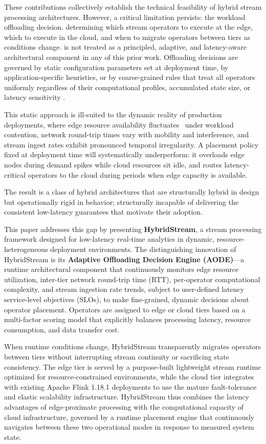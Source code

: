 \documentclass[preprint,review,12pt]{elsarticle}
\begin{document}
These contributions collectively establish the technical feasibility of hybrid stream processing architectures. However, a critical limitation persists: the workload offloading decision. determining which stream operators to execute at the edge, which to execute in the cloud, and when to migrate operators between tiers as conditions change. is not treated as a principled, adaptive, and latency-aware architectural component in any of this prior work. Offloading decisions are governed by static configuration parameters set at deployment time, by application-specific heuristics, or by coarse-grained rules that treat all operators uniformly regardless of their computational profiles, accumulated state size, or latency sensitivity \cite{wang2022edgecloud,nazir2022hybrid,alsurdeh2021hybrid}.

This static approach is ill-suited to the dynamic reality of production deployments, where edge resource availability fluctuates~\cite{wang2019delay} under workload contention, network round-trip times vary with mobility and interference, and stream ingest rates exhibit pronounced temporal irregularity. A placement policy fixed at deployment time will systematically underperform: it overloads edge nodes during demand spikes while cloud resources sit idle, and routes latency-critical operators to the cloud during periods when edge capacity is available. 

The result is a class of hybrid architectures that are structurally hybrid in design but operationally rigid in behavior; structurally incapable of delivering the consistent low-latency guarantees that motivate their adoption.

This paper addresses this gap by presenting \textbf{HybridStream}, a stream processing framework designed for low-latency real-time analytics in dynamic, resource-heterogeneous deployment environments. The distinguishing innovation of HybridStream is its \textbf{Adaptive Offloading Decision Engine (AODE)}—a runtime architectural component that continuously monitors edge resource utilization, inter-tier network round-trip time (RTT), per-operator computational complexity, and stream ingestion rate trends, subject to user-defined latency service-level objectives (SLOs), to make fine-grained, dynamic decisions about operator placement. Operators are assigned to edge or cloud tiers based on a multi-factor scoring model that explicitly balances processing latency, resource consumption, and data transfer cost. 

When runtime conditions change, HybridStream transparently migrates operators between tiers without interrupting stream continuity or sacrificing state consistency. The edge tier is served by a purpose-built lightweight stream runtime optimized for resource-constrained environments, while the cloud tier integrates with existing Apache Flink 1.18.1 deployments to use the mature fault-tolerance and elastic scalability infrastructure. HybridStream thus combines the latency advantages of edge-proximate processing with the computational capacity of cloud infrastructure, governed by a runtime placement engine that continuously navigates between these two operational modes in response to measured system state.
\end{document}
